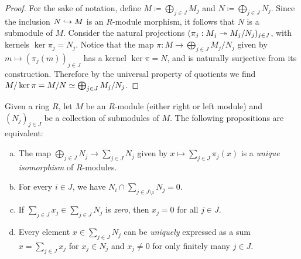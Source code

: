 \begin{proof}
For the sake of notation, define \(M \coloneq \bigoplus_{j \in J} M_j\) and
\(N \coloneq \bigoplus_{j \in J} N_j\). Since the inclusion \(N \hookrightarrow M\) is an
\(R\)-module morphism, it follows that \(N\) is a submodule of \(M\). Consider
the natural projections \((\pi_j: M_j \twoheadrightarrow M_j/N_j)_{j \in J}\), with kernels
\(\ker \pi_j = N_j\). Notice that the map
\(\pi: M \to \bigoplus_{j \in J} M_j/N_j\) given by
\(m \mapsto (\pi_j(m))_{j \in J}\) has a kernel \(\ker \pi = N\), and is
naturally surjective from its construction. Therefore by the universal property
of quotients we find \(M/\ker \pi = M/N \simeq \bigoplus_{j \in J} M_j/N_j\).
\end{proof}

\begin{proposition}
\label{prop:internal-sum-modules}
Given a ring \(R\), let \(M\) be an \(R\)-module (either right or left module)
and \((N_j)_{j \in J}\) be a collection of submodules of \(M\). The following
propositions are equivalent:
\begin{enumerate}[(a)]\setlength\itemsep{0em}
\item The map \(\bigoplus_{j \in J} N_j \to \sum_{j \in J} N_j\) given by
  \(x \mapsto \sum_{j \in J} \pi_j(x)\) is a \emph{unique isomorphism} of
  \(R\)-modules.

\item For every \(i \in J\), we have
  \(N_i \cap \sum_{j \in J \setminus i} N_j = 0\).

\item If \(\sum_{j \in J} x_j \in \sum_{j \in J} N_j\) is \emph{zero}, then
  \(x_j = 0\) for all \(j \in J\).

\item Every element \(x \in \sum_{j \in J} N_j\) can be \emph{uniquely}
  expressed as a sum \(x = \sum_{j \in J} x_j\) for \(x_j \in N_j\) and
  \(x_j \neq 0\) for only finitely many \(j \in J\).
\end{enumerate}
\end{proposition}

